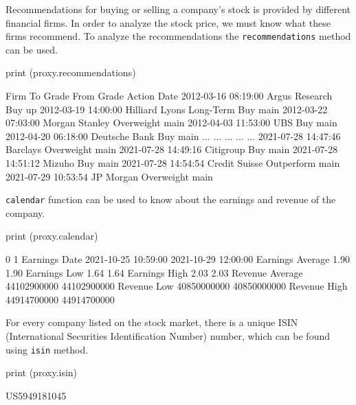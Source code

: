 Recommendations for buying or selling a company’s stock is provided by different financial firms. In order to analyze the stock price, we must know what these firms recommend. To analyze the recommendations the \texttt{recommendations} method can be used.

\begin{ipython}
print (proxy.recommendations)
\end{ipython}
\begin{ioutput}
                               Firm       To Grade From Grade Action
Date                                                                
2012-03-16 08:19:00  Argus Research            Buy                up
2012-03-19 14:00:00  Hilliard Lyons  Long-Term Buy              main
2012-03-22 07:03:00  Morgan Stanley     Overweight              main
2012-04-03 11:53:00             UBS            Buy              main
2012-04-20 06:18:00   Deutsche Bank            Buy              main
...                             ...            ...        ...    ...
2021-07-28 14:47:46        Barclays     Overweight              main
2021-07-28 14:49:16       Citigroup            Buy              main
2021-07-28 14:51:12          Mizuho            Buy              main
2021-07-28 14:54:54   Credit Suisse     Outperform              main
2021-07-29 10:53:54       JP Morgan     Overweight              main
\end{ioutput}

\texttt{calendar} function can be used to know about the earnings and revenue of the company.

\begin{ipython}
print (proxy.calendar)
\end{ipython}
\begin{ioutput}
                                    0                    1
Earnings Date     2021-10-25 10:59:00  2021-10-29 12:00:00
Earnings Average                 1.90                 1.90
Earnings Low                     1.64                 1.64
Earnings High                    2.03                 2.03
Revenue Average           44102900000          44102900000
Revenue Low               40850000000          40850000000
Revenue High              44914700000          44914700000
\end{ioutput}

For every company listed on the stock market, there is a unique ISIN (International Securities Identification Number) number, which can be found using \texttt{isin} method.

\begin{ipython}
print (proxy.isin)
\end{ipython}
\begin{ioutput}
US5949181045
\end{ioutput}

